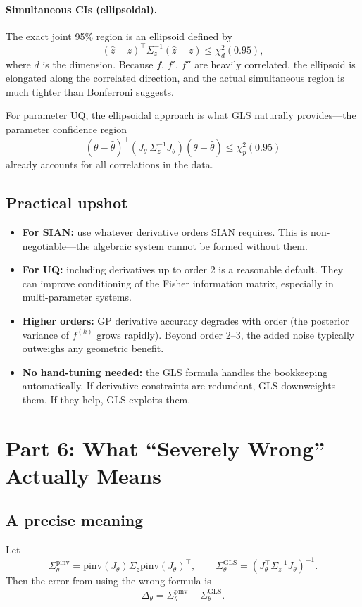 \documentclass[11pt]{article}
\begin{document}
\paragraph{Simultaneous CIs (ellipsoidal).}
The exact joint 95\% region is an ellipsoid defined by
\[
(\hat{z}-z)^\top \Sigma_z^{-1} (\hat{z}-z) \leq \chi^2_d(0.95),
\]
where $d$ is the dimension. Because $f$, $f'$, $f''$ are heavily correlated, the ellipsoid is elongated along the correlated direction, and the actual simultaneous region is much tighter than Bonferroni suggests.

For parameter UQ, the ellipsoidal approach is what GLS naturally provides---the parameter confidence region
\[
(\theta-\hat{\theta})^\top (J_\theta^\top \Sigma_z^{-1} J_\theta)(\theta-\hat{\theta}) \leq \chi^2_p(0.95)
\]
already accounts for all correlations in the data.

\subsection*{Practical upshot}
\begin{itemize}
    \item \textbf{For SIAN:} use whatever derivative orders SIAN requires. This is non-negotiable---the algebraic system cannot be formed without them.
    \item \textbf{For UQ:} including derivatives up to order 2 is a reasonable default. They can improve conditioning of the Fisher information matrix, especially in multi-parameter systems.
    \item \textbf{Higher orders:} GP derivative accuracy degrades with order (the posterior variance of $f^{(k)}$ grows rapidly). Beyond order 2--3, the added noise typically outweighs any geometric benefit.
    \item \textbf{No hand-tuning needed:} the GLS formula handles the bookkeeping automatically. If derivative constraints are redundant, GLS downweights them. If they help, GLS exploits them.
\end{itemize}

\section{Part 6: What ``Severely Wrong'' Actually Means}

\subsection*{A precise meaning}
Let
\[
\Sigma_\theta^{\mathrm{pinv}}
=
\mathrm{pinv}(J_\theta)\Sigma_z\mathrm{pinv}(J_\theta)^\top,
\qquad
\Sigma_\theta^{\mathrm{GLS}}
=
(J_\theta^\top \Sigma_z^{-1}J_\theta)^{-1}.
\]
Then the error from using the wrong formula is
\[
\Delta_\theta
=
\Sigma_\theta^{\mathrm{pinv}}-\Sigma_\theta^{\mathrm{GLS}}.
\]
\end{document}
